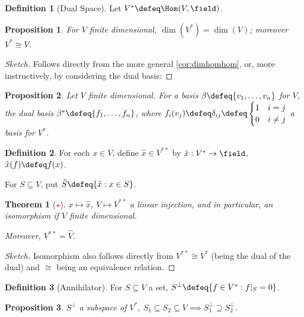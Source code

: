 \documentclass[12pt, oneside]{article}
\theoremstyle{definition}
\newtheorem{defn}{Definition}
\theoremstyle{plain}
\newtheorem{thm}{Theorem}
\newtheorem{prop}{Proposition}
\theoremstyle{remark}
\begin{document}
\begin{defn}[Dual Space]
  Let $V^\ast \defeq \Hom(V, \field)$.
\end{defn}
\begin{prop}
  For $V$ finite dimensional, $\dim(V^\ast) = \dim(V)$; moreover $V^\ast \cong V$.
\end{prop}
\begin{proof}[Sketch]
  Follows directly from the more general \cref{cor:dimhomhom}, or, more instructively, by considering the dual basis:
\end{proof}
\begin{prop}
  Let $V$ finite dimensional. For a basis $\beta \defeq \{v_1, \dots, v_n\}$ for $V$, the dual basis $\beta^\ast \defeq \{f_1, \dots, f_n\}$, where $f_i(v_j) \defeq \delta_{ij} \defeq \begin{cases}
    1 & i = j\\
    0 & i \neq j
  \end{cases}$ a basis for $V^\ast$.
\end{prop}

\begin{defn}
  For each $x \in V$, define $\hat{x} \in V^{\ast \ast}$ by $\hat{x} : V^\ast \to \field$, $\hat{x}(f) \defeq f(x)$.

  For $S \subseteq V$, put $\hat{S} \defeq \{\hat{x} : x \in S\}$.
\end{defn}

\begin{thm}[\textcolor{red}{$\star$}]
  $x \mapsto \hat{x}$, $V \mapsto V^{\ast \ast}$ a linear injection, and in particular, an isomorphism if $V$ finite dimensional.

  Moreover, $V^{\ast \ast} = \hat{V}$.
\end{thm}

\begin{proof}[Sketch]
  Isomorphism also follows directly from $V^{\ast \ast} \cong V^{\ast}$ (being the dual of the dual) and $\cong$ being an equivalence relation.
\end{proof}

\begin{defn}[Annihilator]
  For $S \subseteq V$ a set, $S^\perp \defeq \{f \in V^\ast : f\vert_S = 0\}$.
\end{defn}

\begin{prop}
  $S^\perp$ a subspace of $V^\ast$, $S_1 \subseteq S_2 \subseteq V \implies S_1^\perp \supseteq S_2^\perp$.
\end{prop}
\end{document}
